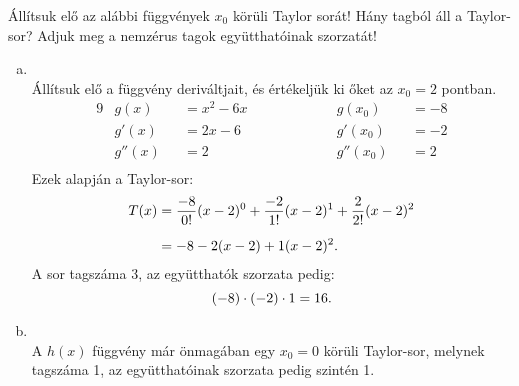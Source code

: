 \begin{exercise}{%
    Állítsuk elő az alábbi függvények $x_0$ körüli Taylor sorát!
    Hány tagból áll a Taylor-sor? Adjuk meg a nemzérus tagok együtthatóinak
    szorzatát!
  }
{\begin{enumerate}[a)]
      \item {}\\[1mm]
            Állítsuk elő a függvény deriváltjait, és értékeljük ki őket az
            $x_0 = 2$ pontban.
            \begin{alignat*}{9}
               & g(x)   &  & = x^2 - 6x \hspace{2cm} &  & g(x_0)   &  & = -8 \\
               & g'(x)  &  & = 2x - 6 \hspace{2cm}   &  & g'(x_0)  &  & = -2 \\
               & g''(x) &  & = 2 \hspace{2cm}        &  & g''(x_0) &  & = 2  \\
            \end{alignat*}
            Ezek alapján a Taylor-sor:
            \begin{align*}
              T(x)
               & = \frac{-8}{0!}(x - 2)^0
              + \frac{-2}{1!}(x - 2)^1
              + \frac{2}{2!}(x - 2)^2
              \\[2mm]
               & = -8
              - 2(x - 2)
              + 1(x - 2)^2
              \text.
            \end{align*}
            A sor tagszáma 3, az együtthatók szorzata pedig:
            \[
              (-8) \cdot (-2) \cdot 1 = 16
              \text.
            \]

      \item {}\\[1mm]
            A $h(x)$ függvény már önmagában egy $x_0 = 0$ körüli Taylor-sor,
            melynek tagszáma 1, az együtthatóinak szorzata pedig szintén 1.
    \end{enumerate}
  }
\end{exercise}
